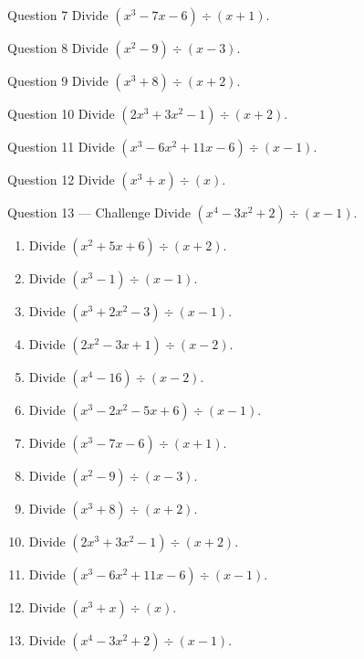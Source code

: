 \documentclass[11pt]{article}
\begin{document}
\begin{qbox}{Question 7}
Divide $(x^3-7x-6)\div(x+1)$.\workspace{2.4cm}
\end{qbox}

\begin{qbox}{Question 8}
Divide $(x^2-9)\div(x-3)$.\workspace{2.4cm}
\end{qbox}

\begin{qbox}{Question 9}
Divide $(x^3+8)\div(x+2)$.\workspace{2.4cm}
\end{qbox}

\begin{qbox}{Question 10}
Divide $(2x^3+3x^2-1)\div(x+2)$.\workspace{2.4cm}
\end{qbox}

\begin{qbox}{Question 11}
Divide $(x^3-6x^2+11x-6)\div(x-1)$.\workspace{2.4cm}
\end{qbox}

\begin{qbox}{Question 12}
Divide $(x^3+x)\div(x)$.\workspace{2.4cm}
\end{qbox}

\begin{qbox}{Question 13 --- Challenge}
Divide $(x^4-3x^2+2)\div(x-1)$.\workspace{3.2cm}
\end{qbox}

\clearpage
{}

\begin{recapbox}
\begin{multicols}{2}
\small
\begin{enumerate}[leftmargin=*,itemsep=3pt]
  \item Divide $(x^2+5x+6)\div(x+2)$.
  \item Divide $(x^3-1)\div(x-1)$.
  \item Divide $(x^3+2x^2-3)\div(x-1)$.
  \item Divide $(2x^2-3x+1)\div(x-2)$.
  \item Divide $(x^4-16)\div(x-2)$.
  \item Divide $(x^3-2x^2-5x+6)\div(x-1)$.
  \item Divide $(x^3-7x-6)\div(x+1)$.
  \item Divide $(x^2-9)\div(x-3)$.
  \item Divide $(x^3+8)\div(x+2)$.
  \item Divide $(2x^3+3x^2-1)\div(x+2)$.
  \item Divide $(x^3-6x^2+11x-6)\div(x-1)$.
  \item Divide $(x^3+x)\div(x)$.
  \item Divide $(x^4-3x^2+2)\div(x-1)$.
\end{enumerate}
\end{multicols}
\end{recapbox}
\end{document}

